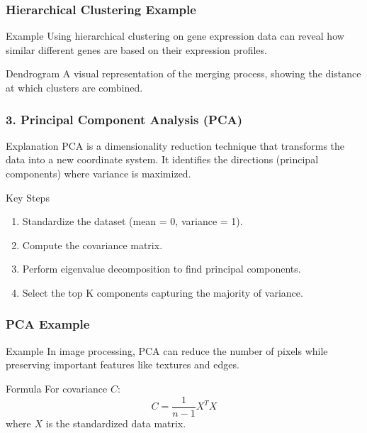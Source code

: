\documentclass[aspectratio=169]{beamer}
\begin{document}
\begin{frame}[fragile]
    \frametitle{Hierarchical Clustering Example}
    \begin{block}{Example}
        Using hierarchical clustering on gene expression data can reveal how similar different genes are based on their expression profiles.
    \end{block}
    \begin{block}{Dendrogram}
        A visual representation of the merging process, showing the distance at which clusters are combined.
    \end{block}
\end{frame}

\begin{frame}[fragile]
    \frametitle{3. Principal Component Analysis (PCA)}
    \begin{block}{Explanation}
        PCA is a dimensionality reduction technique that transforms the data into a new coordinate system. It identifies the directions (principal components) where variance is maximized.
    \end{block}
    \begin{block}{Key Steps}
        \begin{enumerate}
            \item Standardize the dataset (mean = 0, variance = 1).
            \item Compute the covariance matrix.
            \item Perform eigenvalue decomposition to find principal components.
            \item Select the top K components capturing the majority of variance.
        \end{enumerate}
    \end{block}
\end{frame}

\begin{frame}[fragile]
    \frametitle{PCA Example}
    \begin{block}{Example}
        In image processing, PCA can reduce the number of pixels while preserving important features like textures and edges.
    \end{block}
    \begin{block}{Formula}
        For covariance $C$:
        \begin{equation}
            C = \frac{1}{n-1} X^T X
        \end{equation}
        where $X$ is the standardized data matrix.
    \end{block}
\end{frame}
\end{document}
